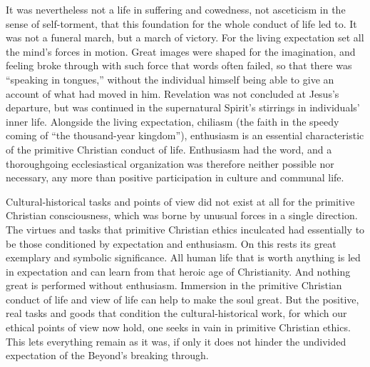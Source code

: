 \documentclass[12pt,a4paper]{book}
\newcommand{\opage}[1]{\marginnote{\footnotesize\textit{[#1]}}}
\begin{document}
It was nevertheless not a life in suffering and cowedness, not asceticism in the sense of self-torment, that
this foundation for the whole conduct of life led to. It was not a funeral march, but a march of victory.
For the living expectation set all the mind's forces in motion. Great images were shaped for the
imagination, and feeling broke through with such force that words often failed, so that there was ``speaking
in tongues,'' without the individual himself being able to give an account of what had moved in him.
Revelation was not concluded at Jesus's departure, but was continued in the supernatural Spirit's stirrings
in individuals' inner life. Alongside the living expectation, chiliasm (the faith in the speedy coming of
``the thousand-year kingdom''), enthusiasm is an essential characteristic of the primitive Christian conduct
of life. Enthusiasm had the word, and a thoroughgoing ecclesiastical organization was therefore neither
possible nor necessary, any more than positive participation in culture and communal life.

Cultural-historical tasks and points of view did not exist at all for the primitive Christian consciousness,
which was borne by unusual forces in a single direction. The virtues and tasks that primitive Christian
ethics inculcated had essentially to be those conditioned by 
\opage{231}expectation and enthusiasm. On this rests its
great exemplary and symbolic significance. All human life that is worth anything is led in expectation and
can learn from that heroic age of Christianity. And nothing great is performed without enthusiasm. Immersion
in the primitive Christian conduct of life and view of life can help to make the soul great. But the
positive, real tasks and goods that condition the cultural-historical work, for which our ethical points of
view now hold, one seeks in vain in primitive Christian ethics. This lets everything remain as it was, if
only it does not hinder the undivided expectation of the Beyond's breaking through.
\end{document}
